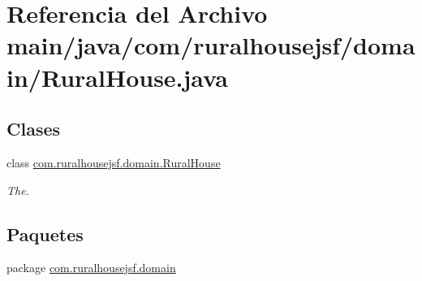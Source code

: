 \hypertarget{a00047}{}\section{Referencia del Archivo main/java/com/ruralhousejsf/domain/\+Rural\+House.java}
\label{a00047}
\subsection*{Clases}
\begin{DoxyCompactItemize}
\item 
class \mbox{\hyperlink{a00188}{com.\+ruralhousejsf.\+domain.\+Rural\+House}}
\begin{DoxyCompactList}\small\item\em The. \end{DoxyCompactList}\end{DoxyCompactItemize}
\subsection*{Paquetes}
\begin{DoxyCompactItemize}
\item 
package \mbox{\hyperlink{a00114}{com.\+ruralhousejsf.\+domain}}
\end{DoxyCompactItemize}
